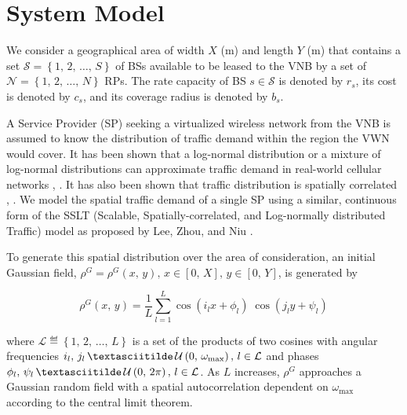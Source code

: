 \documentclass[onecolumn,draftcls]{IEEEtran}
\begin{document}


\section{System Model} \label{sec:model}
We consider a geographical area of width $X$ (m) and length $Y$ (m) that contains a set $\mathcal{S} = \left\{1,\, 2,\, \ldots,\, S\right\}$ of BSs available to be leased to the VNB by a set of $\mathcal{N} = \left\{1,\, 2,\, \ldots,\, N\right\}$ RPs.  The rate capacity of BS $s \in \mathcal{S}$ is denoted by $r_s$, its cost is denoted by $c_s$, and its coverage radius is denoted by $b_s$.

A Service Provider (SP) seeking a virtualized wireless network from the VNB is assumed to know the distribution of traffic demand within the region the VWN would cover.  It has been shown that a log-normal distribution or a mixture of log-normal distributions can approximate traffic demand in real-world cellular networks \cite{686105}, \cite{5936263}.  It has also been shown that traffic distribution is spatially correlated \cite{5936263}, \cite{eigenplaces}.  We model the spatial traffic demand of a single SP using a similar, continuous form of the SSLT (Scalable, Spatially-correlated, and Log-normally distributed Traffic) model as proposed by Lee, Zhou, and Niu \cite{6554749}.

To generate this spatial distribution over the area of consideration, an initial Gaussian field, $\rho^G = \rho^G\left(x,\, y\right),\, x \in \left[0,\, X\right],\, y \in \left[0,\, Y\right]$, is generated by

\begin{equation}
\rho^G\left(x,\, y\right)=\frac{1}{L}\sum_{l=1}^L \cos\left(i_lx+\phi_l\right) \; \cos\left(j_ly+\psi_l\right)
\end{equation}

\noindent \sloppy where $\mathcal{L} \eqdef \left\{1,\, 2,\, \ldots,\, L\right\}$ is a set of the products of two cosines with angular frequencies $i_l,\, j_l\, \textasciitilde\, \mathcal{U}\left(0,\, \omega_{\max}\right),\, l \in \mathcal{L}$ and phases $\phi_l,\, \psi_l\, \textasciitilde\, \mathcal{U}\left(0,\, 2\pi\right),\, l \in \mathcal{L}$.  As $L$ increases, $\rho^G$ approaches a Gaussian random field with a spatial autocorrelation dependent on $\omega_{\max}$ according to the central limit theorem.
\end{document}
